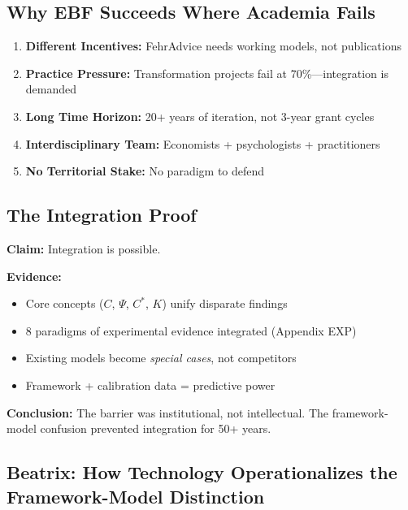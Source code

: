 \subsection{Why EBF Succeeds Where Academia Fails}

\begin{enumerate}
\item \textbf{Different Incentives:} FehrAdvice needs working models, not publications
\item \textbf{Practice Pressure:} Transformation projects fail at 70\%—integration is demanded
\item \textbf{Long Time Horizon:} 20+ years of iteration, not 3-year grant cycles
\item \textbf{Interdisciplinary Team:} Economists + psychologists + practitioners
\item \textbf{No Territorial Stake:} No paradigm to defend
\end{enumerate}

\subsection{The Integration Proof}

\begin{tcolorbox}[colback=green!5!white, colframe=green!75!black,
    title=Evidence-Based Framework: Existence Proof]
\textbf{Claim:} Integration is possible.

\textbf{Evidence:}
\begin{itemize}
\item Core concepts ($C$, $\Psi$, $C^*$, $K$) unify disparate findings
\item 8 paradigms of experimental evidence integrated (Appendix EXP)
\item Existing models become \textit{special cases}, not competitors
\item Framework + calibration data = predictive power
\end{itemize}

\textbf{Conclusion:} The barrier was institutional, not intellectual.
The framework-model confusion prevented integration for 50+ years.
\end{tcolorbox}


\subsection{Beatrix: How Technology Operationalizes the Framework-Model Distinction}
\label{sec:meta-beatrix}

